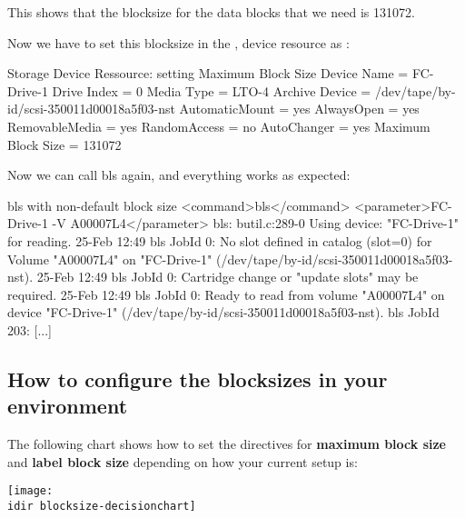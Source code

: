 This shows that the blocksize for the data blocks that we need is 131072.

Now we have to set this blocksize in the , device
resource as :

\begin{bconfig}{Storage Device Ressource: setting Maximum Block Size}
Device {
  Name = FC-Drive-1
  Drive Index = 0
  Media Type = LTO-4
  Archive Device = /dev/tape/by-id/scsi-350011d00018a5f03-nst
  AutomaticMount = yes
  AlwaysOpen = yes
  RemovableMedia = yes
  RandomAccess = no
  AutoChanger = yes
  Maximum Block Size = 131072
}
\end{bconfig}


Now we can call bls again, and everything works as expected:
\begin{commands}{bls with non-default block size}
<command>bls</command> <parameter>FC-Drive-1 -V A00007L4</parameter>
bls: butil.c:289-0 Using device: "FC-Drive-1" for reading.
25-Feb 12:49 bls JobId 0: No slot defined in catalog (slot=0) for Volume "A00007L4" on "FC-Drive-1" (/dev/tape/by-id/scsi-350011d00018a5f03-nst).
25-Feb 12:49 bls JobId 0: Cartridge change or "update slots" may be required.
25-Feb 12:49 bls JobId 0: Ready to read from volume "A00007L4" on device "FC-Drive-1" (/dev/tape/by-id/scsi-350011d00018a5f03-nst).
bls JobId 203: [...]
\end{commands}


\subsection*{How to configure the blocksizes in your environment}
The following chart shows how to set the directives for {\bf maximum block size} and {\bf label block size}
depending on how your current setup is:

\begin{center}
\texttt{[image: \\idir blocksize-decisionchart]}
\end{center}
